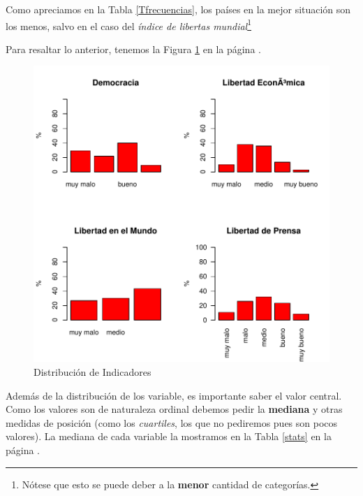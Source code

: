 Como apreciamos en la Tabla \ref{Tfrecuencias}, los países en la mejor situación son los menos, salvo en el caso del \emph{índice de libertas mundial}\footnote{Nótese que esto se puede deber a la {\bf menor} cantidad de categorías.}

\clearpage

Para resaltar lo anterior, tenemos la Figura \ref{barplots} en la página \pageref{barplots}. 


\begin{figure}[h]
\centering
\includegraphics{paperVersion_7_univariada-barplots}
\caption{Distribución de Indicadores}
\label{barplots}
\end{figure}

Además de la distribución de los variable, es importante saber el valor central. Como los valores son de naturaleza ordinal debemos pedir la {\bf mediana} y otras medidas de posición (como los \emph{cuartiles}, los que no pediremos pues son pocos valores). La mediana de cada variable la mostramos en la Tabla \ref{stats} en la página \pageref{stats}.

